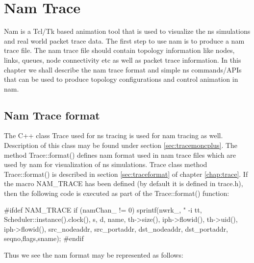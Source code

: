 \chapter{Nam Trace}
\label{chap:namtrace}

Nam is a Tcl/Tk based animation tool that is used to visualize the ns
simulations and real world packet trace data. The first step to use nam is
to produce a nam trace file. The nam trace file should contain topology
information like nodes, links, queues, node connectivity etc as well as
packet trace information. In this chapter we shall describe the nam trace
format and simple ns commands/APIs that can be used to produce topology 
configurations and control animation in nam.

\section{Nam Trace format}
\label{sec:namtraceformat}
The C++ class Trace used for ns tracing is used for nam tracing as
well. Description of this class may be found under section
\ref{sec:tracemoncplus}. The method Trace::format() defines nam 
format used in nam trace files which are used by nam for
visualization of ns simulations. Trace class method Trace::format() is
described in section \ref{sec:traceformat} of chapter \ref{chap:trace}. If
the macro NAM\_TRACE has been defined (by default it is defined in
trace.h), then the following code is executed as part of the
Trace::format() function:

\begin{program}
#ifdef NAM_TRACE
        if (namChan_ != 0)
                sprintf(nwrk_,
                        "%
-i %
                        tt,
                        Scheduler::instance().clock(),
                        s,
                        d,
                        name,
                        th->size(),
                        iph->flowid(),
                        th->uid(),
                        iph->flowid(),
                        src_nodeaddr,
                        src_portaddr,
                        dst_nodeaddr,
                        dst_portaddr,
                        seqno,flags,sname);
#endif  
\end{program}

Thus we see the nam format may be represented as follows:
\\

